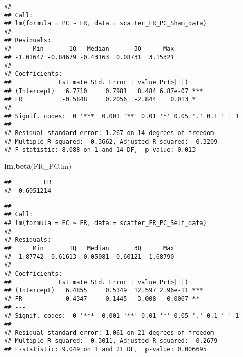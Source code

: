 \documentclass[
]{article}
\newenvironment{Shaded}{\begin{snugshade}}{\end{snugshade}}
\newcommand{\CommentTok}[1]{\textcolor[rgb]{0.56,0.35,0.01}{\textit{#1}}}
\newcommand{\DataTypeTok}[1]{\textcolor[rgb]{0.13,0.29,0.53}{#1}}
\newcommand{\KeywordTok}[1]{\textcolor[rgb]{0.13,0.29,0.53}{\textbf{#1}}}
\newcommand{\NormalTok}[1]{#1}
\newcommand{\OperatorTok}[1]{\textcolor[rgb]{0.81,0.36,0.00}{\textbf{#1}}}
\newcommand{\StringTok}[1]{\textcolor[rgb]{0.31,0.60,0.02}{#1}}
\begin{document}
\begin{verbatim}
## 
## Call:
## lm(formula = PC ~ FR, data = scatter_FR_PC_Sham_data)
## 
## Residuals:
##      Min       1Q   Median       3Q      Max 
## -1.01647 -0.84679 -0.43163  0.08731  3.15321 
## 
## Coefficients:
##             Estimate Std. Error t value Pr(>|t|)    
## (Intercept)   6.7710     0.7981   8.484 6.87e-07 ***
## FR           -0.5848     0.2056  -2.844    0.013 *  
## ---
## Signif. codes:  0 '***' 0.001 '**' 0.01 '*' 0.05 '.' 0.1 ' ' 1
## 
## Residual standard error: 1.267 on 14 degrees of freedom
## Multiple R-squared:  0.3662, Adjusted R-squared:  0.3209 
## F-statistic: 8.088 on 1 and 14 DF,  p-value: 0.013
\end{verbatim}

\begin{Shaded}
\begin{Highlighting}[]
\KeywordTok{lm.beta}\NormalTok{(FR_PC.lm)}
\end{Highlighting}
\end{Shaded}

\begin{verbatim}
##         FR 
## -0.6051214
\end{verbatim}

\begin{Shaded}
\end{Shaded}

\begin{verbatim}
## 
## Call:
## lm(formula = PC ~ FR, data = scatter_FR_PC_Self_data)
## 
## Residuals:
##      Min       1Q   Median       3Q      Max 
## -1.87742 -0.61613 -0.05081  0.60121  1.68790 
## 
## Coefficients:
##             Estimate Std. Error t value Pr(>|t|)    
## (Intercept)   6.4855     0.5149  12.597 2.96e-11 ***
## FR           -0.4347     0.1445  -3.008   0.0067 ** 
## ---
## Signif. codes:  0 '***' 0.001 '**' 0.01 '*' 0.05 '.' 0.1 ' ' 1
## 
## Residual standard error: 1.061 on 21 degrees of freedom
## Multiple R-squared:  0.3011, Adjusted R-squared:  0.2679 
## F-statistic: 9.049 on 1 and 21 DF,  p-value: 0.006695
\end{verbatim}
\end{document}
